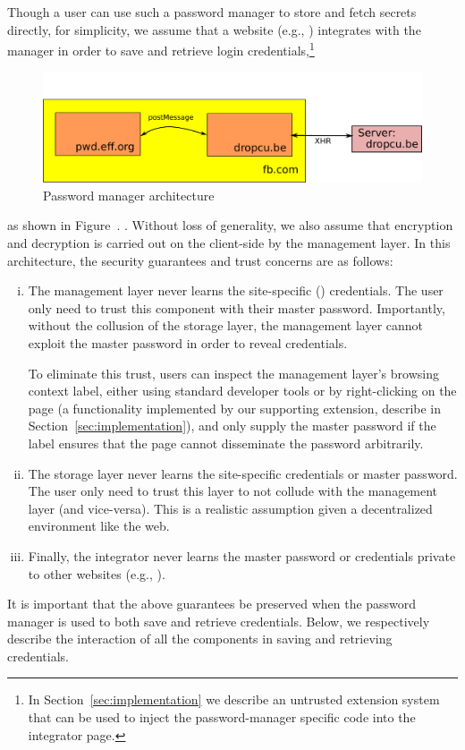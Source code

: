 %
Though a user can use such a password manager to store and fetch secrets
directly, for simplicity, we assume that a website (e.g., )
integrates with the manager in order to save and retrieve login
credentials,\footnote{ In Section~\ref{sec:implementation} we describe an
  untrusted extension system that can be used to inject the password-manager
  specific code into the integrator page.  }
\iffigures
\begin{figure}
\begin{center}
\includegraphics[scale=0.35]{pmanager.pdf}
\end{center}
\vspace{-10pt}
\caption{\label{fig:manager-s-1} Password manager architecture}
\vspace{-10pt}
\end{figure}
 as shown in
Figure~.
\else
.
\fi
%
Without loss of generality, we also assume that encryption and
decryption is carried out on the client-side by the management layer.
%
In this architecture, the security guarantees and trust concerns
are as follows:
\begin{enumerate}[i)]
\item The management layer never learns the site-specific ()
  credentials. The user only need to trust this component with their master
  password. Importantly, without the collusion of the storage layer, the
  management layer cannot exploit the master password in order to reveal
  credentials.

  To eliminate this trust, users can inspect the management layer's
  browsing context label, either using standard developer tools or by
  right-clicking on the page (a functionality implemented by our
  supporting extension, describe in Section~\ref{sec:implementation}),
  and only supply the master password if the label ensures that the
  page cannot disseminate the password arbitrarily.

\item The storage layer never learns the site-specific credentials or
  master password. The user only need to trust this layer to not
  collude with the management layer (and vice-versa). This is a
  realistic assumption given a decentralized environment like the web.

\item Finally, the integrator never learns the master password or
  credentials private to other websites (e.g., ).
\end{enumerate}
%
It is important that the above guarantees be preserved when the
password manager is used to both save and retrieve credentials.
%
Below, we respectively describe the interaction of all the components
in saving and retrieving credentials.

